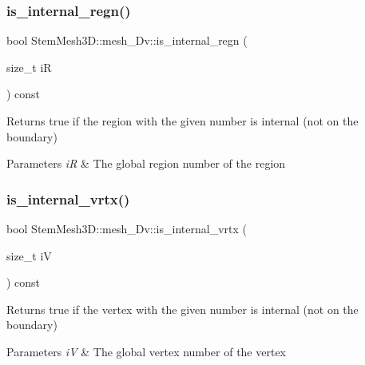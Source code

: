 \subsubsection{\texorpdfstring{is\+\_\+internal\+\_\+regn()}{is\_internal\_regn()}}
{\footnotesize\ttfamily bool Stem\+Mesh3\+D\+::mesh\+\_\+Dv\+::is\+\_\+internal\+\_\+regn (\begin{DoxyParamCaption}\item[{size\+\_\+t}]{iR }\end{DoxyParamCaption}) const}



Returns true if the region with the given number is internal (not on the boundary) 


\begin{DoxyParams}{Parameters}
{\em iR} & The global region number of the region \\
\hline
\end{DoxyParams}
\mbox{\label{classStemMesh3D_1_1mesh__3Dv_aa7dc342e2b241b485f5a5f8f722e660f}} 
\subsubsection{\texorpdfstring{is\+\_\+internal\+\_\+vrtx()}{is\_internal\_vrtx()}}
{\footnotesize\ttfamily bool Stem\+Mesh3\+D\+::mesh\+\_\+Dv\+::is\+\_\+internal\+\_\+vrtx (\begin{DoxyParamCaption}\item[{size\+\_\+t}]{iV }\end{DoxyParamCaption}) const}



Returns true if the vertex with the given number is internal (not on the boundary) 


\begin{DoxyParams}{Parameters}
{\em iV} & The global vertex number of the vertex \\
\hline
\end{DoxyParams}
\mbox{\label{classStemMesh3D_1_1mesh__3Dv_a3290b6cc7656e81ccb9ffa0da954755d}} 
